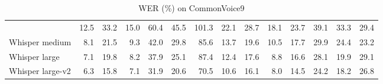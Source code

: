 \begin{table}[H]
\begin{tabular}{l|rrrrrrrrrrrrr}
& 12.5 & 33.2 & 15.0 & 60.4 & 45.5 & 101.3 & 22.1 & 28.7 & 18.1 & 23.7 & 39.1 & 33.3 & 29.4 
\\
Whisper medium 
& 8.1 & 21.5 & 9.3 & 42.0 & 29.8 & 85.6 & 13.7 & 19.6 & 10.5 & 17.7 & 29.9 & 24.4 & 23.2 
\\
Whisper large 
& 7.1 & 19.8 & 8.2 & 37.9 & 25.1 & 87.4 & 12.4 & 17.6 & 8.8 & 16.6 & 28.1 & 19.9 & 29.1 
\\
Whisper large-v2 
& 6.3 & 15.8 & 7.1 & 31.9 & 20.6 & 70.5 & 10.6 & 16.1 & 8.0 & 14.5 & 24.2 & 18.2 & 26.8 
\\
\bottomrule
\end{tabular}
\caption{WER (\%) on CommonVoice9}\label{tab:cv9-asr}
\end{table}
